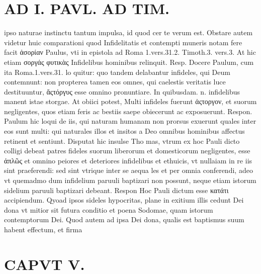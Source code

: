 \documentclass{article}
\begin{document}
\begin{pages}
\section*{AD I. PAVL. AD TIM. }
\marginpar{[ p.268 ]}\pstart ipso naturae instinctu tantum impulsa, id quod cer te verum est. Obstare autem videtur huic comparationi quod Infidelitatis et contempti muneris notam fere facit ἀσορίαν Paulus, vti in epistola ad Roma 1.vers.31.2. Timoth.3. vers.3. At hic etiam σοργάς φυτικὰς Infidelibus hominibus relinquit. Resp. Docere Paulum, cum ita Roma.1.vers.31. lo quitur: quo tandem delabantur infideles, qui Deum contemnunt: non propterea tamen eos omnes, qui caelestis veritatis luce destituuntur, ἄςτόργυς esse omnino pronuntiare. In quibusdam. n. infidelibus manent istae storgae. At obiici potest, Multi infideles fuerunt ἀςτοργον, et suorum negligentes, quos etiam feris ac bestiis saepe obiecerunt ac exposuerunt. Respon. Paulum hic loqui de iis, qui naturam humanam non prorsus exuerunt quales inter eos sunt multi: qui naturales illos et insitos a Deo omnibus hominibus affectus retinent et sentiunt. Disputat hic insulse Tho mas, vtrum ex hoc Pauli dicto colligi debeat patres fideles suorum liberorum et domesticorum negligentes, esse ἀπλῶς et omnino peiores et deteriores infidelibus et ethuicis, vt nullaiam in re iis sint praeferendi: sed sint vtrique inter se aequa les et per omnia conferendi, adeo vt quemadmo dum infidelium paruuli baptizari non possunt, neque etiam istorum sidelium paruuli baptizari debeant. Respon Hoc Pauli dictum esse κατάτι accipiendum. Qyoad ipsos sideles hypocritas, plane in exitium illis cedunt Dei dona vt mitior sit futura conditio et poena Sodomae, quam istorum contemptorum Dei. Quod autem ad ipsa Dei dona, qualis est baptismus suum habent effectum, et firma  \pend
\section*{CAPVT  V. }
\marginpar{[ p.269 ]}\pstart {}
{}

\end{pages}
\end{document}
